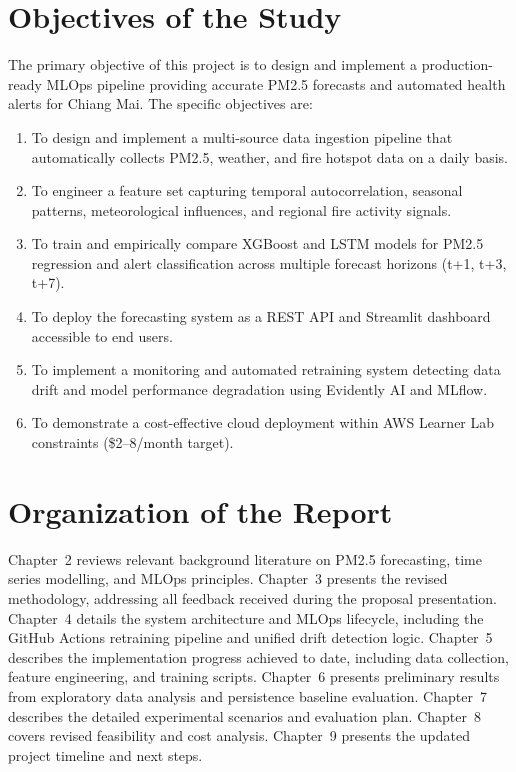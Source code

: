 \documentclass[12pt,a4paper]{report}
\begin{document}
\section{Objectives of the Study}

The primary objective of this project is to design and implement a production-ready MLOps pipeline providing accurate PM2.5 forecasts and automated health alerts for Chiang Mai. The specific objectives are:

\begin{enumerate}
  \item To design and implement a multi-source data ingestion pipeline that automatically collects PM2.5, weather, and fire hotspot data on a daily basis.
  \item To engineer a feature set capturing temporal autocorrelation, seasonal patterns, meteorological influences, and regional fire activity signals.
  \item To train and empirically compare XGBoost and LSTM models for PM2.5 regression and alert classification across multiple forecast horizons (t+1, t+3, t+7).
  \item To deploy the forecasting system as a REST API and Streamlit dashboard accessible to end users.
  \item To implement a monitoring and automated retraining system detecting data drift and model performance degradation using Evidently AI and MLflow.
  \item To demonstrate a cost-effective cloud deployment within AWS Learner Lab constraints (\$2--8/month target).
\end{enumerate}

\section{Organization of the Report}

Chapter~2 reviews relevant background literature on PM2.5 forecasting, time series modelling, and MLOps principles. Chapter~3 presents the revised methodology, addressing all feedback received during the proposal presentation. Chapter~4 details the system architecture and MLOps lifecycle, including the GitHub Actions retraining pipeline and unified drift detection logic. Chapter~5 describes the implementation progress achieved to date, including data collection, feature engineering, and training scripts. Chapter~6 presents preliminary results from exploratory data analysis and persistence baseline evaluation. Chapter~7 describes the detailed experimental scenarios and evaluation plan. Chapter~8 covers revised feasibility and cost analysis. Chapter~9 presents the updated project timeline and next steps.
\end{document}
